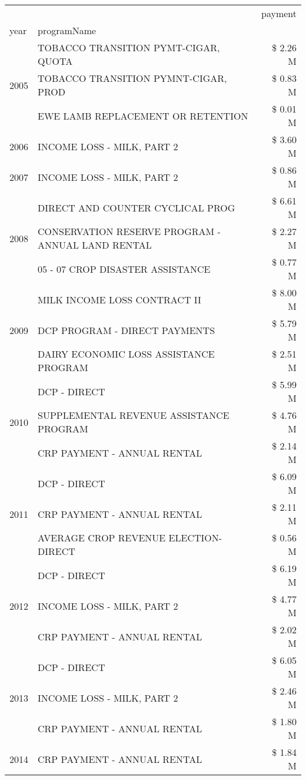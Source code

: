 \begin{tabular}{llr}
\toprule
 &  & payment \\
year & programName &  \\
\midrule
\multirow[t]{3}{*}{2005} & TOBACCO TRANSITION PYMT-CIGAR, QUOTA & \$ 2.26 M \\
 & TOBACCO TRANSITION PYMNT-CIGAR, PROD & \$ 0.83 M \\
 & EWE LAMB REPLACEMENT OR RETENTION & \$ 0.01 M \\
\cline{1-3}
2006 & INCOME LOSS - MILK, PART 2 & \$ 3.60 M \\
\cline{1-3}
2007 & INCOME LOSS - MILK, PART 2 & \$ 0.86 M \\
\cline{1-3}
\multirow[t]{3}{*}{2008} & DIRECT AND COUNTER CYCLICAL PROG & \$ 6.61 M \\
 & CONSERVATION RESERVE PROGRAM - ANNUAL LAND RENTAL & \$ 2.27 M \\
 & 05 - 07 CROP DISASTER ASSISTANCE & \$ 0.77 M \\
\cline{1-3}
\multirow[t]{3}{*}{2009} & MILK INCOME LOSS CONTRACT II & \$ 8.00 M \\
 & DCP PROGRAM - DIRECT PAYMENTS & \$ 5.79 M \\
 & DAIRY ECONOMIC LOSS ASSISTANCE PROGRAM & \$ 2.51 M \\
\cline{1-3}
\multirow[t]{3}{*}{2010} & DCP - DIRECT & \$ 5.99 M \\
 & SUPPLEMENTAL REVENUE ASSISTANCE PROGRAM & \$ 4.76 M \\
 & CRP PAYMENT - ANNUAL RENTAL & \$ 2.14 M \\
\cline{1-3}
\multirow[t]{3}{*}{2011} & DCP - DIRECT & \$ 6.09 M \\
 & CRP PAYMENT - ANNUAL RENTAL & \$ 2.11 M \\
 & AVERAGE CROP REVENUE ELECTION-DIRECT & \$ 0.56 M \\
\cline{1-3}
\multirow[t]{3}{*}{2012} & DCP - DIRECT & \$ 6.19 M \\
 & INCOME LOSS - MILK, PART 2 & \$ 4.77 M \\
 & CRP PAYMENT - ANNUAL RENTAL & \$ 2.02 M \\
\cline{1-3}
\multirow[t]{3}{*}{2013} & DCP - DIRECT & \$ 6.05 M \\
 & INCOME LOSS - MILK, PART 2 & \$ 2.46 M \\
 & CRP PAYMENT - ANNUAL RENTAL & \$ 1.80 M \\
\cline{1-3}
\multirow[t]{3}{*}{2014} & CRP PAYMENT - ANNUAL RENTAL & \$ 1.84 M \\

\end{tabular}
